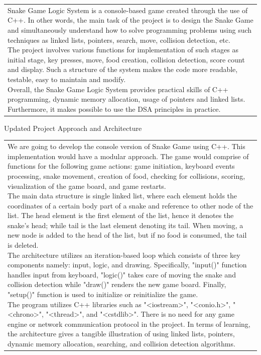 \documentclass[12pt,a4paper]{article}
\newcommand{\sectiontitle}[1]{%
    {\color{GEUBlue}
    \fontsize{18}{22}\selectfont #1}
}
\newcommand{\answerbox}[2]{%
    \begin{tabularx}{\textwidth}{
        |>{\raggedright\arraybackslash}X|}
        \hline
        \parbox[t][#1][t]{\dimexpr\linewidth-12pt\relax}{
            \vspace{5pt}
            \fontsize{11}{13}\selectfont #2
        }\\
        \hline
    \end{tabularx}
}
\begin{document}
\answerbox{5.80cm}{Snake Game Logic System is a console-based game created through the use of C++. In other words, the main task of the project is to design the Snake Game and simultaneously understand how to solve programming problems using such techniques as linked lists, pointers, search, move, collision detection, etc.\\

The project involves various functions for implementation of such stages as initial stage, key presses, move, food creation, collision detection, score count and display.
Such a structure of the system makes the code more readable, testable, easy to maintain and modify.\\

Overall, the Snake Game Logic System provides practical skills of C++ programming, dynamic memory allocation, usage of pointers and linked lists.
Furthermore, it makes possible to use the DSA principles in practice. }

\vspace{0.70cm}

\sectiontitle{Updated Project Approach and Architecture}

\vspace{0.05cm}


\vspace{0.25cm}

\answerbox{8.75cm}{We are going to develop the console version of Snake Game using C++. This implementation would have a modular approach. The game would comprise of functions for the following game actions: game initiation, keyboard events processing, snake movement, creation of food, checking for collisions, scoring, visualization of the game board, and game restarts. \\

The main data structure is single linked list, where each element holds the coordinates of a certain body part of a snake and reference to other node of the list. The head element is the first element of the list, hence it denotes the snake's head; while tail is the last element denoting its tail. When moving, a new node is added to the head of the list, but if no food is consumed, the tail is deleted.\\
The architecture utilizes an iteration-based loop which consists of three key components namely: input, logic, and drawing. Specifically, "input()" function handles input from keyboard, "logic()" takes care of moving the snake and collision detection while "draw()" renders the new game board. Finally, "setup()" function is used to initialize or reinitialize the game.\\

The program utilizes C++ libraries such as "<iostream>", "<conio.h>", "<chrono>", "<thread>", and "<cstdlib>". There is no need for any game engine or network communication protocol in the project. In terms of learning, the architecture gives a tangible illustration of using linked lists, pointers, dynamic memory allocation, searching, and collision detection algorithms.}
\end{document}
